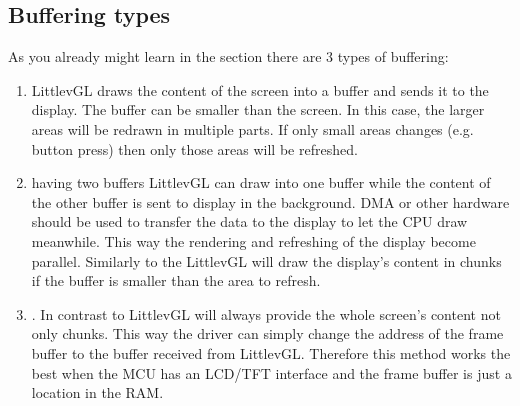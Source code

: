 \documentclass[letterpaper,10pt,english]{sphinxmanual}
\begin{document}
\subsection{Buffering types}
\label{\detokenize{overview/drawing:buffering-types}}
As you already might learn in the {\hyperref[\detokenize{porting/display::doc}]{}} section there are 3 types of buffering:
\begin{enumerate}
\def\theenumi{\arabic{enumi}}
\def\labelenumi{\theenumi .}
\makeatletter\def\p@enumii{\p@enumi \theenumi .}\makeatother
\item {} 
 LittlevGL draws the content of the screen into a buffer and sends it to the display. The buffer can be smaller than the screen. In this case, the larger areas will be redrawn in multiple parts. If only small areas changes (e.g. button press) then only those areas will be refreshed.

\item {} 
 having two buffers LittlevGL can draw into one buffer while the content of the other buffer is sent to display in the background.
DMA or other hardware should be used to transfer the data to the display to let the CPU draw meanwhile.
This way the rendering and refreshing of the display become parallel. Similarly to the  LittlevGL will draw the display’s content in chunks if the buffer is smaller than the area to refresh.

\item {} 
.
In contrast to  LittlevGL will always provide the whole screen’s content not only chunks. This way the driver can simply change the address of the frame buffer to the buffer received from LittlevGL.
Therefore this method works the best when the MCU has an LCD/TFT interface and the frame buffer is just a location in the RAM.

\end{enumerate}
\end{document}
